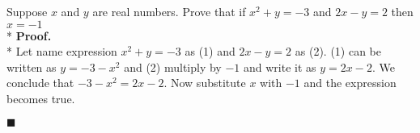 \documentclass{amsart}
\begin{document}
Suppose $x$ and $y$ are real numbers. Prove that if $x^2+y=-3$ and $2x-y=2$ then $x = -1$ \\*
\textbf{Proof.} \\*
Let name expression $x^2+y=-3$ as (1) and $2x-y=2$ as (2). (1) can be written as $y=-3-x^2$ and (2) multiply by $-1$ and write it as $y=2x-2$. We conclude that $-3-x^2=2x-2$. Now substitute $x$ with $-1$ and the expression becomes true.


$\blacksquare$
\end{document}
